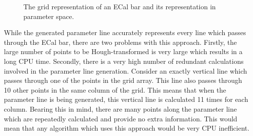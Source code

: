 \begin{figure}%
  \centering
  \hspace{1em}
  \caption{The grid representation of an ECal bar and its representation in parameter space.}
  \label{fig:ECalBarGridRepresentationAndHoughTransform}
\end{figure}
\newline
\newline
While the generated parameter line accurately represents every line which passes through the ECal bar, there are two problems with this approach.  Firstly, the large number of points to be Hough-transformed is very large which results in a long CPU time.  Secondly, there is a very high number of redundant calculations involved in the parameter line generation.  Consider an exactly vertical line which passes through one of the points in the grid array.  This line also passes through 10 other points in the same column of the grid.  This means that when the parameter line is being generated, this vertical line is calculated 11 times for each column.  Bearing this in mind, there are many points along the parameter line which are repeatedly calculated and provide no extra information.  This would mean that any algorithm which uses this approach would be very CPU inefficient.
\newline
\newline
